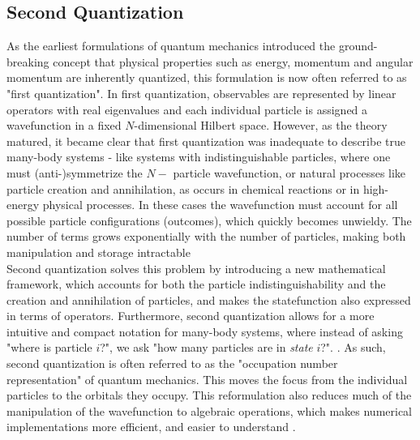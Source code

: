 \documentclass{subfiles}
\begin{document}
\subsection{Second Quantization}
As the earliest formulations of quantum mechanics introduced the ground-breaking concept that physical properties such as energy, momentum and angular momentum are inherently quantized, this formulation is now often referred to as "first quantization". In first quantization, observables are represented by linear operators with real eigenvalues and each individual particle is assigned a wavefunction in a fixed $N$-dimensional Hilbert space.
However, as the theory matured, it became clear that first quantization was inadequate to describe true many-body systems - like systems with indistinguishable particles, where one must (anti-)symmetrize the $N-$ particle wavefunction, or natural processes like particle creation and annihilation, as occurs in chemical reactions or in high-energy physical processes. In these cases the wavefunction must account for all possible particle configurations (outcomes), which quickly becomes unwieldy. The number of terms grows exponentially with the number of particles, making both manipulation and storage intractable \cite{helgaker2013molecular, szabo1996modern}\\

Second quantization solves this problem by introducing a new mathematical framework, which accounts for both the particle indistinguishability and the creation and annihilation of particles, and makes the statefunction also expressed in terms of operators. Furthermore, second quantization allows for a more intuitive and compact notation for many-body systems, where instead of asking "where is particle $i$?", we ask "how many particles are in \emph{state} $i$?". \cite{szabo1996modern, shavitt2009many, helgaker2013molecular}. As such, second quantization is often referred to as the "occupation number representation" of quantum mechanics. This moves the focus from the individual particles to the orbitals they occupy. This reformulation also reduces much of the manipulation of the wavefunction to algebraic operations, which makes numerical implementations more efficient, and easier to understand \cite{helgaker2013molecular}.
\\ 
\end{document}
